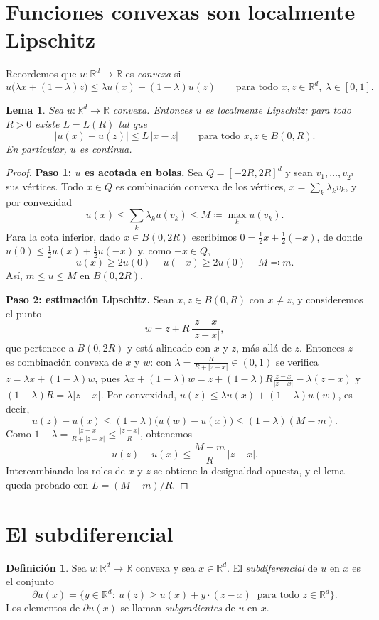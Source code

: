 \documentclass[12pt, a4paper]{amsbook}
\newcommand{\R}{{\mathbb R}}
\newtheorem{lema}[teo]{Lema}
\theoremstyle{remark}
\theoremstyle{definition}
\newtheorem{defi}[teo]{Definición}
\numberwithin{section}{chapter}
\numberwithin{subsection}{section}
\numberwithin{equation}{section}
\numberwithin{figure}{chapter}
\begin{document}
\section{Funciones convexas son localmente Lipschitz}

Recordemos que $u\colon\R^d\to\R$ es \emph{convexa} si
\[
u\bigl(\lambda x+(1-\lambda)z\bigr)\le\lambda u(x)+(1-\lambda)u(z)
\qquad\text{para todo }x,z\in\R^d,\ \lambda\in[0,1].
\]

\begin{lema}\label{lema.convexa.lipschitz}
Sea $u\colon\R^d\to\R$ convexa. Entonces $u$ es localmente Lipschitz: para
todo $R>0$ existe $L=L(R)$ tal que
\[
|u(x)-u(z)|\le L\,|x-z|
\qquad\text{para todo }x,z\in B(0,R).
\]
En particular, $u$ es continua.
\end{lema}

\begin{proof}
\textbf{Paso 1: $u$ es acotada en bolas.}
Sea $Q=[-2R,2R]^d$ y sean $v_1,\dots,v_{2^d}$ sus vértices. Todo $x\in Q$ es
combinación convexa de los vértices, $x=\sum_k\lambda_kv_k$, y por convexidad
\[
u(x)\le\sum_k\lambda_k u(v_k)\le M\coloneqq\max_k u(v_k).
\]
Para la cota inferior, dado $x\in B(0,2R)$ escribimos $0=\tfrac12x+\tfrac12(-x)$,
de donde $u(0)\le\tfrac12u(x)+\tfrac12u(-x)$ y, como $-x\in Q$,
\[
u(x)\ge2u(0)-u(-x)\ge2u(0)-M\eqqcolon m.
\]
Así, $m\le u\le M$ en $B(0,2R)$.

\medskip
\textbf{Paso 2: estimación Lipschitz.}
Sean $x,z\in B(0,R)$ con $x\neq z$, y consideremos el punto
\[
w=z+R\,\frac{z-x}{|z-x|},
\]
que pertenece a $B(0,2R)$ y está alineado con $x$ y $z$, más allá de $z$.
Entonces $z$ es combinación convexa de $x$ y $w$: con $\lambda=\tfrac{R}{R+|z-x|}\in(0,1)$
se verifica $z=\lambda x+(1-\lambda)w$, pues
$\lambda x+(1-\lambda)w=z+(1-\lambda)R\tfrac{z-x}{|z-x|}-\lambda(z-x)$ y
$(1-\lambda)R=\lambda|z-x|$. Por convexidad,
$u(z)\le\lambda u(x)+(1-\lambda)u(w)$, es decir, 
$$
u(z)-u(x)\le(1-\lambda)\bigl(u(w)-u(x)\bigr)\le(1-\lambda)(M-m).
$$
Como $1-\lambda=\tfrac{|z-x|}{R+|z-x|}\le\tfrac{|z-x|}{R}$, obtenemos
\[
u(z)-u(x)\le\frac{M-m}{R}\,|z-x|.
\]
Intercambiando los roles de $x$ y $z$ se obtiene la desigualdad opuesta, y el
lema queda probado con $L=(M-m)/R$.
\end{proof}

\section{El subdiferencial}

\begin{defi}\label{def.subdiferencial}
Sea $u\colon\R^d\to\R$ convexa y sea $x\in\R^d$. El \emph{subdiferencial} de
$u$ en $x$ es el conjunto
\[
\partial u(x)
=
\bigl\{
y\in\R^d:\ u(z)\ge u(x)+y\cdot(z-x)\ \text{ para todo }z\in\R^d
\bigr\}.
\]
Los elementos de $\partial u(x)$ se llaman \emph{subgradientes} de $u$ en $x$.
\end{defi}
\end{document}
